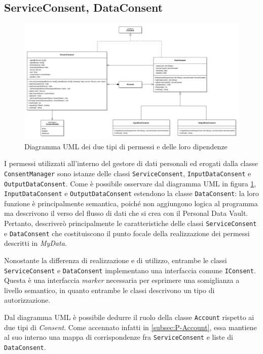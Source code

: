 \subsection{ServiceConsent, DataConsent}
\label{subsec:P-ServiceConsentDataConsent}
\begin{figure} [h]
	\includegraphics[width=\linewidth]{pictures/Auth-Consents.png}
	\caption{Diagramma UML dei due tipi di permessi e delle loro dipendenze}
	\label{fig:Auth-Consents}
\end{figure}
I permessi utilizzati all’interno del gestore di dati personali ed erogati dalla classe \texttt{ConsentManager} sono istanze delle classi \texttt{ServiceConsent}, \texttt{InputDataConsent} e \texttt{OutputDataConsent}. Come \`e possibile osservare dal diagramma UML in figura \ref{fig:Auth-Consents}, \texttt{InputDataConsent} e \texttt{OutputDataConsent} estendono la classe \texttt{DataConsent}: la loro funzione \`e principalmente semantica, poich\'e non aggiungono logica al programma ma descrivono il verso del flusso di dati che si crea con il Personal Data Vault. Pertanto, descriver\`o principalmente le caratteristiche delle classi \texttt{ServiceConsent} e \texttt{DataConsent} che costituiscono il punto focale della realizzazione dei permessi descritti in \textit{MyData}.

Nonostante la differenza di realizzazione e di utilizzo, entrambe le classi \texttt{ServiceConsent} e \texttt{DataConsent} implementano una interfaccia comune \texttt{IConsent}. Questa \`e una interfaccia \textit{marker} necessaria per esprimere una somiglianza a livello semantico, in quanto entrambe le classi descrivono un tipo di autorizzazione.

Dal diagramma UML \`e possibile dedurre il ruolo della classe \texttt{Account} rispetto ai due tipi di \textit{Consent}. Come accennato infatti in \ref{subsec:P-Account}, essa mantiene al suo interno una mappa di corrispondenze fra \texttt{ServiceConsent} e liste di \texttt{DataConsent}.

